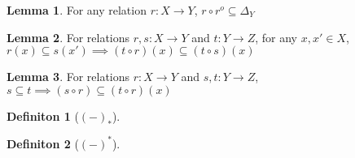 \documentclass[18pt,a4paper]{article}
\theoremstyle{definition}
\newtheorem{definition}{Definiton}[section]
\newtheorem{lemma}{Lemma}[definition]
\begin{document}
	\begin{lemma}
		For any relation $r:X \to Y$, $r \circ r^o \subseteq \Delta_Y$
	\end{lemma}
	\begin{lemma} For relations $r,s:X\to Y$ and $t:Y\to Z$,
		for any $x,x' \in X$, $r(x)\subseteq s(x') \implies (t \circ r)(x) \subseteq
		(t \circ s)(x)$

	\end{lemma}
	\begin{lemma} For relations $r:X\to Y$ and $s,t:Y\to Z$,
		$s\subseteq t \implies (s \circ r) \subseteq
		(t \circ r)(x)$

	\end{lemma}
	\begin{definition}[$(-)_*$] %

	\end{definition}
	\begin{definition}[$(-)^*$] %

	\end{definition}
\end{document}
